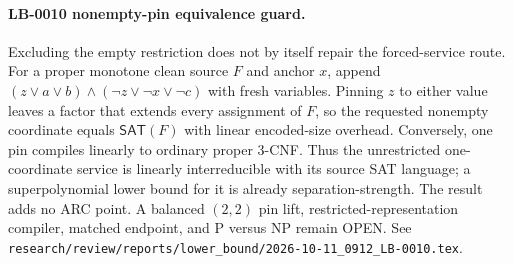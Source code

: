 \paragraph{LB-0010 nonempty-pin equivalence guard.}
Excluding the empty restriction does not by itself repair the forced-service
route.  For a proper monotone clean source $F$ and anchor $x$, append
$(z\vee a\vee b)\wedge(\neg z\vee\neg x\vee\neg c)$ with fresh variables.
Pinning $z$ to either value leaves a factor that extends every assignment of
$F$, so the requested nonempty coordinate equals $\mathsf{SAT}(F)$ with
linear encoded-size overhead.  Conversely, one pin compiles linearly to
ordinary proper 3-CNF.  Thus the unrestricted one-coordinate service is
linearly interreducible with its source SAT language; a superpolynomial lower
bound for it is already separation-strength.  The result adds no ARC point.
A balanced $(2,2)$ pin lift, restricted-representation compiler, matched
endpoint, and P versus NP remain OPEN.  See
\texttt{research/review/reports/lower\_bound/2026-10-11\_0912\_LB-0010.tex}.

